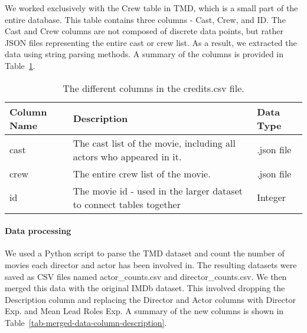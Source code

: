     \begin{multicols}{2}
        We worked exclusively with the Crew table in TMD, which is a small part of the
            entire database.
        This table contains three columns - Cast, Crew, and ID.
        The Cast and Crew columns are not composed of discrete data points, but rather
            JSON files representing the entire cast or crew list.
        As a result, we extracted the data using string parsing methods.
        A summary of the columns is provided in
            Table~\ref{tab-Credits-Column-Description}.
    \end{multicols}

    \begin{table}[h]
        \centering
        \begin{tabular}{lp{10cm}l}
            \toprule
            Column Name & Description                                                          & Data Type  \\
            \midrule
            cast        & The cast list of the movie, including all actors who appeared in it. & .json file \\
            crew        & The entire crew list of the movie.                                   & .json file \\
            id          & The movie id - used in the larger dataset to connect tables together & Integer    \\
            \bottomrule
        \end{tabular}
        \caption[short]{The different columns in the credits.csv file.}\label{tab-Credits-Column-Description}
    \end{table}

    \begin{multicols}{2}
        \paragraph{Data processing}
            We used a Python script to parse the TMD dataset and count the number of movies
                each director and actor has been involved in.
            The resulting datasets were saved as CSV files named actor\_counts.csv and
                director\_counts.csv.
            We then merged this data with the original IMDb dataset.
            This involved dropping the Description column and replacing the Director and
                Actor columns with Director Exp.
            and Mean Lead Roles Exp.
            A summary of the new columns is shown in
                Table~\ref{tab-merged-data-column-description}.
    \end{multicols}

